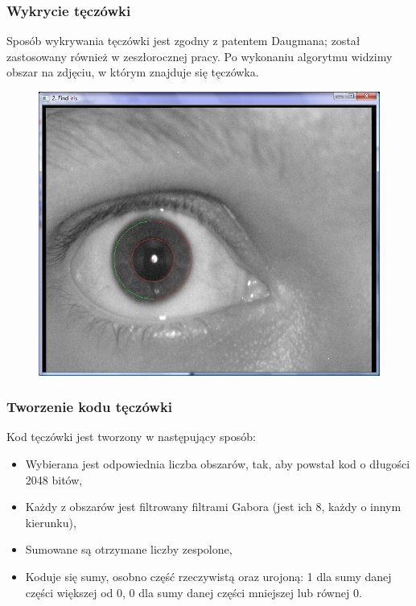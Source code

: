 \documentclass{beamer}
\begin{document}

\begin{frame}
\frametitle{Wykrycie tęczówki}
Sposób wykrywania tęczówki jest zgodny z patentem Daugmana; został zastosowany również w zeszłorocznej pracy. Po wykonaniu algorytmu widzimy obszar na zdjęciu, w którym znajduje się tęczówka.
\begin{figure}
\begin{center}
\includegraphics[scale=0.25]{teczowka_nasza.jpg}
\end{center}
\end{figure}
\end{frame}


\begin{frame}
\frametitle{Tworzenie kodu tęczówki}
Kod tęczówki jest tworzony w następujący sposób:
\begin{itemize}
\item Wybierana jest odpowiednia liczba obszarów, tak, aby powstał kod o długości 2048 bitów,
\item Każdy z obszarów jest filtrowany filtrami Gabora (jest ich 8, każdy o innym kierunku),
\item Sumowane są otrzymane liczby zespolone,
\item Koduje się sumy, osobno część rzeczywistą oraz urojoną: 1 dla sumy danej części większej od 0, 0 dla sumy danej części mniejszej lub równej 0.
\end{itemize}
\end{frame}
\end{document}
